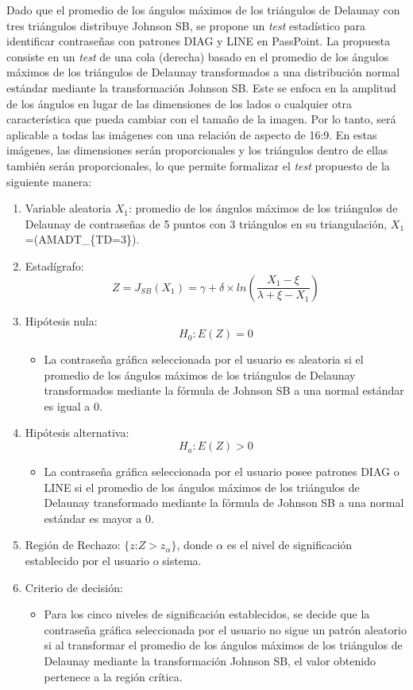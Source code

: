 \documentclass[12pt]{report}
\begin{document}
Dado  que el promedio de los ángulos máximos de los triángulos de Delaunay con tres triángulos distribuye Johnson SB, se propone un  \textit{test} estadístico para identificar contraseñas con patrones DIAG y LINE en PassPoint. La propuesta consiste en un \textit{test} de una cola (derecha) basado en el promedio de los ángulos máximos de los triángulos de Delaunay transformados a una distribución normal estándar mediante la transformación Johnson SB.
Este se enfoca en la amplitud de los ángulos en lugar de las dimensiones de los lados o cualquier otra característica que pueda cambiar con el tamaño de la imagen. Por lo tanto, será aplicable a todas las imágenes con una relación de aspecto de 16:9. En estas imágenes, las dimensiones serán proporcionales y los triángulos dentro de ellas también serán proporcionales, lo que permite formalizar el \textit{test} propuesto de la siguiente manera:

\begin{enumerate}
	\item Variable aleatoria $X_1$: promedio de los ángulos máximos de los triángulos de Delaunay de contraseñas de 5 puntos con 3 triángulos en su triangulación, $X_1$=(AMADT\_\{TD=3\}).
	\item Estadígrafo: \[
	Z= J_{SB}(X_1) =  \gamma + \delta \times ln\left(\frac{X_1 - \xi}{\lambda + \xi - X_1}\right)
	\]

	\item Hipótesis nula: \[H_0:E(Z)=0\]
	\begin{itemize}
		\item La contraseña gráfica seleccionada por el usuario es aleatoria si el promedio de los ángulos máximos de los triángulos de Delaunay  transformados mediante la fórmula de Johnson SB a una normal estándar es igual a 0.
	\end{itemize}
	
	
	\item Hipótesis alternativa: \[H_a:E(Z)>0\]
			\begin{itemize}
			\item La contraseña gráfica seleccionada por el usuario posee patrones DIAG o LINE  si el promedio de los ángulos máximos de los triángulos de Delaunay  transformado mediante la fórmula de Johnson SB a una normal estándar es mayor a 0.
		\end{itemize}
	
	\item  Región de Rechazo: $\{z$:$Z>z_\alpha\}$, donde $\alpha$ es el nivel de significación establecido por el usuario o sistema. 
	
	\item Criterio de decisión:
	\begin{itemize}
		\item Para los cinco niveles de significación establecidos, se decide que la contraseña gráfica seleccionada por el usuario no sigue un patrón aleatorio si al transformar el promedio de los ángulos máximos de los triángulos de Delaunay mediante la transformación Johnson SB, el valor obtenido pertenece a la región crítica. 
	\end{itemize}
	\end{enumerate}	 
\end{document}
